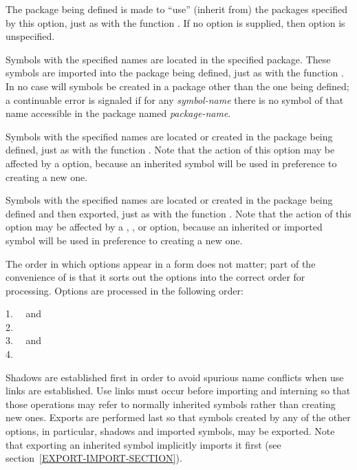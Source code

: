 \begin{defmac}
\begin{flushdesc}
\item[\cd{(:use \Mstar\emph{package-name})}]
The package being defined is made to ``use'' (inherit from)
the packages specified by this option, just as with
the function .
If no  option is supplied, then option is unspecified.

\item[\cd{(:import-from \emph{package-name} \Mstar\emph{symbol-name})}]
Symbols with the specified names are located in the specified package.
These symbols are imported into the package being defined,
just as with the function .
In no case will symbols be created in a package other than
the one being defined;
a continuable error is signaled if for any \emph{symbol-name} there
is no symbol of that name accessible in the package named \emph{package-name}.

\item[\cd{(:intern \Mstar\emph{symbol-name})}]
Symbols with the specified names are located or created
in the package being defined, just as with the function
.  Note that the action of this option may be
affected by a 
option, because an inherited symbol will be used in preference
to creating a new one.

\item[\cd{(:export \Mstar\emph{symbol-name})}]
Symbols with the specified names are located or created
in the package being defined and then exported, just as with the function
.  Note that the action of this option may be
affected by a , , or 
option, because an inherited or imported symbol will be used in preference
to creating a new one.
\end{flushdesc}

The order in which options appear in a  form does not matter;
part of the convenience of  is that it sorts out the options
into the correct order for processing.
Options are processed in the following order:
\begin{tabbing}
1.~~ and  \\
2.~~ \\
3.~~ and  \\
4.~~
\end{tabbing}
Shadows are established first in order to avoid spurious name conflicts
when use links are established.  Use links must occur before importing
and interning so that those operations may refer to normally inherited
symbols rather than creating new ones.  Exports are performed last so that
symbols created by any of the other options, in particular,
shadows and imported symbols, may be exported.  Note that exporting an
inherited symbol implicitly imports it first
(see section~\ref{EXPORT-IMPORT-SECTION}).


\end{defmac}
